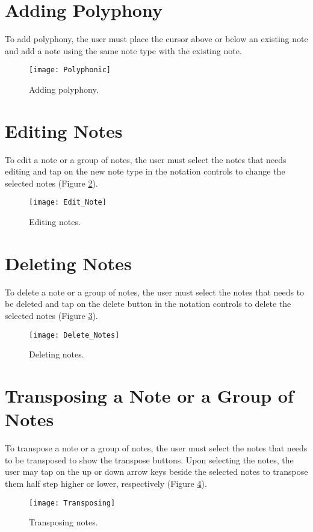 \section{Adding Polyphony}
To add polyphony, the user must place the cursor above or below an existing note and add a note using the same note type with the existing note.

\begin{figure}[H]
  \centering
  \texttt{[image: Polyphonic]}
    \caption{Adding polyphony.}
    \label{fig:polyphony}
\end{figure}

\section{Editing Notes}
To edit a note or a group of notes, the user must select the notes that needs editing and tap on the new note type in the notation controls to change the selected notes (Figure \ref{fig:edit-note}).

\begin{figure}[H]
  \centering
  \texttt{[image: Edit\_Note]}
    \caption{Editing notes.}
    \label{fig:edit-note}
\end{figure}

\section{Deleting Notes}
To delete a note or a group of notes, the user must select the notes that needs to be deleted and tap on the delete button in the notation controls to delete the selected notes (Figure \ref{fig:delete-notes}).

\begin{figure}[H]
  \centering
  \texttt{[image: Delete\_Notes]}
    \caption{Deleting notes.}
    \label{fig:delete-notes}
\end{figure}

\section{Transposing a Note or a Group of Notes}
To transpose a note or a group of notes, the user must select the notes that needs to be transposed to show the transpose buttons. Upon selecting the notes, the user may tap on the up or down arrow keys beside the selected notes to transpose them half step higher or lower, respectively (Figure \ref{fig:transposing}).

\begin{figure}[H]
  \centering
  \texttt{[image: Transposing]}
    \caption{Transposing notes.}
    \label{fig:transposing}
\end{figure}


